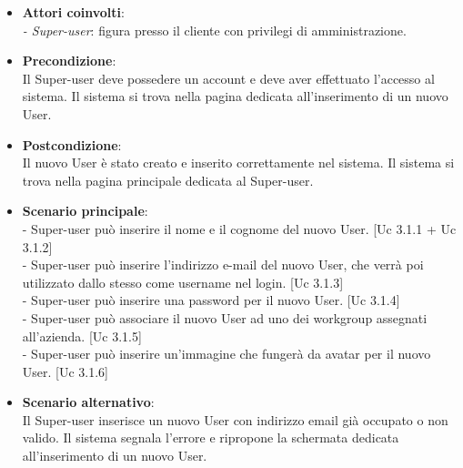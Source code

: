 {\begin{itemize}
\item \textbf{Attori coinvolti}:\\
\emph{- Super-user}: figura presso il cliente con privilegi di amministrazione.

\item \textbf{Precondizione}:\\
Il Super-user deve possedere un account e deve aver effettuato l'accesso al sistema. Il sistema si trova nella pagina dedicata all'inserimento di un nuovo User.

\item \textbf{Postcondizione}:\\
Il nuovo User è stato creato e inserito correttamente nel sistema. Il sistema si trova nella pagina principale dedicata al Super-user.

\item \textbf{Scenario principale}:\\
- Super-user può inserire il nome e il cognome del nuovo User. [Uc 3.1.1 + Uc 3.1.2]\\
- Super-user può inserire l'indirizzo e-mail del nuovo User, che verrà poi utilizzato dallo stesso come username nel login. [Uc 3.1.3]\\
- Super-user può inserire una password per il nuovo User. [Uc 3.1.4]\\
- Super-user può associare il nuovo User ad uno dei workgroup assegnati all'azienda. [Uc 3.1.5]\\
- Super-user può inserire un'immagine che fungerà da avatar per il nuovo User. [Uc 3.1.6]

\item \textbf{Scenario alternativo}:\\
Il Super-user inserisce un nuovo User con indirizzo email già occupato o non valido. Il sistema segnala l'errore e ripropone la schermata dedicata all'inserimento di un nuovo User.

\end{itemize}

\newpage

}
